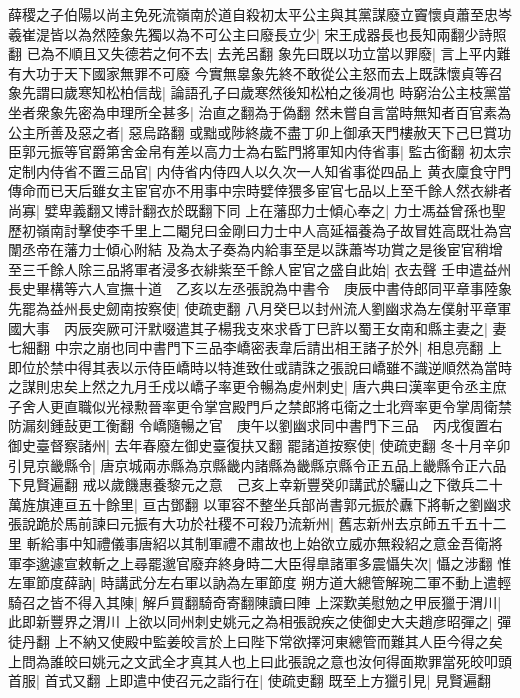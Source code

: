 薛稷之子伯陽以尚主免死流嶺南於道自殺初太平公主與其黨謀廢立竇懷貞蕭至忠岑羲崔湜皆以為然陸象先獨以為不可公主曰廢長立少|{
	宋王成器長也長知兩翻少詩照翻}
已為不順且又失德若之何不去|{
	去羌呂翻}
象先曰既以功立當以罪廢|{
	言上平内難有大功于天下國家無罪不可廢}
今實無辠象先終不敢從公主怒而去上既誅懷貞等召象先謂曰歲寒知松柏信哉|{
	論語孔子曰歲寒然後知松柏之後凋也}
時窮治公主枝黨當坐者衆象先密為申理所全甚多|{
	治直之翻為于偽翻}
然未嘗自言當時無知者百官素為公主所善及惡之者|{
	惡烏路翻}
或黜或陟終歲不盡丁卯上御承天門樓赦天下己巳賞功臣郭元振等官爵第舍金帛有差以高力士為右監門將軍知内侍省事|{
	監古銜翻}
初太宗定制内侍省不置三品官|{
	内侍省内侍四人以久次一人知省事從四品上}
黄衣廩食守門傳命而已天后雖女主宦官亦不用事中宗時嬖倖猥多宦官七品以上至千餘人然衣緋者尚寡|{
	嬖卑義翻又博計翻衣於既翻下同}
上在藩邸力士傾心奉之|{
	力士馮益曾孫也聖歷初嶺南討擊使李千里上二閹兒曰金剛曰力士中人高延福養為子故冒姓高既壮為宫闈丞帝在藩力士傾心附結}
及為太子奏為内給事至是以誅蕭岑功賞之是後宦官稍增至三千餘人除三品將軍者浸多衣緋紫至千餘人宦官之盛自此始|{
	衣去聲}
壬申遣益州長史畢構等六人宣撫十道　乙亥以左丞張說為中書令　庚辰中書侍郎同平章事陸象先罷為益州長史劒南按察使|{
	使疏吏翻}
八月癸巳以封州流人劉幽求為左僕射平章軍國大事　丙辰突厥可汗默啜遣其子楊我支來求昏丁巳許以蜀王女南和縣主妻之|{
	妻七細翻}
中宗之崩也同中書門下三品李嶠密表韋后請出相王諸子於外|{
	相息亮翻}
上即位於禁中得其表以示侍臣嶠時以特進致仕或請誅之張說曰嶠雖不識逆順然為當時之謀則忠矣上然之九月壬戍以嶠子率更令暢為䖍州刺史|{
	唐六典曰漢率更令丞主庶子舍人更直職似光禄勲晉率更令掌宫殿門戶之禁郎將屯衛之士北齊率更令掌周衛禁防漏刻鍾鼔更工衡翻}
令嶠隨暢之官　庚午以劉幽求同中書門下三品　丙戌復置右御史臺督察諸州|{
	去年春廢左御史臺復扶又翻}
罷諸道按察使|{
	使疏吏翻}
冬十月辛卯引見京畿縣令|{
	唐京城兩赤縣為京縣畿内諸縣為畿縣京縣令正五品上畿縣令正六品下見賢遍翻}
戒以歲饑惠養黎元之意　己亥上幸新豐癸卯講武於驪山之下徵兵二十萬旌旗連亘五十餘里|{
	亘古鄧翻}
以軍容不整坐兵部尚書郭元振於纛下將斬之劉幽求張說跪於馬前諫曰元振有大功於社稷不可殺乃流新州|{
	舊志新州去京師五千五十二里}
斬給事中知禮儀事唐紹以其制軍禮不肅故也上始欲立威亦無殺紹之意金吾衛將軍李邈遽宣敕斬之上尋罷邈官廢弃終身時二大臣得臯諸軍多震懾失次|{
	懾之涉翻}
惟左軍節度薛訥|{
	時講武分左右軍以訥為左軍節度}
朔方道大總管解琬二軍不動上遣輕騎召之皆不得入其陳|{
	解戶買翻騎奇寄翻陳讀曰陣}
上深歎美慰勉之甲辰獵于渭川|{
	此即新豐界之渭川}
上欲以同州刺史姚元之為相張說疾之使御史大夫趙彦昭彈之|{
	彈徒丹翻}
上不納又使殿中監姜皎言於上曰陛下常欲擇河東總管而難其人臣今得之矣上問為誰皎曰姚元之文武全才真其人也上曰此張說之意也汝何得面欺罪當死皎叩頭首服|{
	首式又翻}
上即遣中使召元之詣行在|{
	使疏吏翻}
既至上方獵引見|{
	見賢遍翻}
